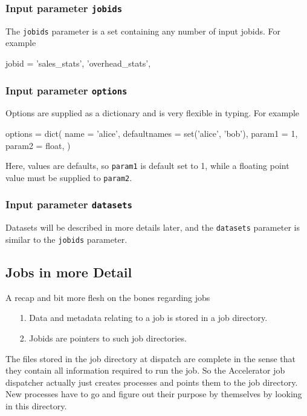 \documentclass[a4paper]{article}
\begin{document}
\subsubsection*{Input parameter \texttt{jobids}}
The \texttt{jobids} parameter is a set containing any number of input
jobids.  For example
\begin{python}
  jobid = {'sales_stats', 'overhead_stats',}
\end{python}


\subsubsection*{Input parameter \texttt{options}}
Options are supplied as a dictionary and is very flexible in typing.  For example
\begin{python}
  options = dict(
    name = 'alice',
    defaultnames = set('alice', 'bob'),
    param1 = 1,
    param2 = float,
  )
\end{python}
Here, values are defaults, so \texttt{param1} is default set to 1,
while a floating point value must be supplied to \texttt{param2}.

\subsubsection*{Input parameter \texttt{datasets}}
Datasets will be described in more details later, and the
\texttt{datasets} parameter is similar to the \texttt{jobids}
parameter.

\clearpage



\subsection{Jobs in more Detail}
A recap and bit more flesh on the bones regarding jobs
\begin{itemize}
\item[1.]  Data and metadata relating to a job is stored in a job directory.
\item[2.]  Jobids are pointers to such job directories.
\end{itemize}
The files stored in the job directory at dispatch are complete in the
sense that they contain all information required to run the job.  So
the Accelerator job dispatcher actually just creates processes and
points them to the job directory.  New processes have to go and figure
out their purpose by themselves by looking in this directory.
\end{document}
